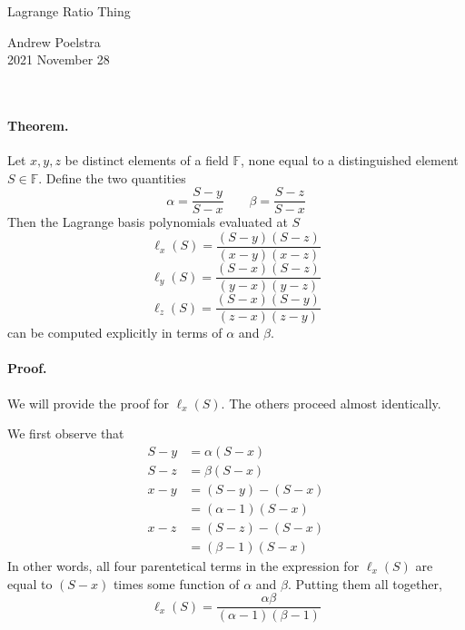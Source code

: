 \documentclass[letterpaper]{article}
\begin{document}
\begin{minipage}[b]{0.7\linewidth}
{\huge Lagrange Ratio Thing}
\end{minipage}
\begin{minipage}[b]{0.3\linewidth}
  \begin{flushright}
    Andrew Poelstra\\
    2021 November 28
  \end{flushright}
\end{minipage}
\\

\paragraph{Theorem.} Let $x,y,z$ be distinct elements of a field $\mathbb{F}$,
none equal to a distinguished element $S\in\mathbb{F}$. Define the two quantities
\[
    \alpha = \frac{S - y}{S - x} \qquad
    \beta = \frac{S - z}{S - x}
\]
Then the Lagrange basis polynomials evaluated at $S$
\[ \ell_x(S) = \frac{(S - y)(S - z)}{(x - y)(x - z)} \]
\[ \ell_y(S) = \frac{(S - x)(S - z)}{(y - x)(y - z)} \]
\[ \ell_z(S) = \frac{(S - x)(S - y)}{(z - x)(z - y)} \]
can be computed explicitly in terms of $\alpha$ and $\beta$.

\paragraph{Proof.} We will provide the proof for $\ell_x(S)$. The others
proceed almost identically.

We first observe that
\begin{align*}
S - y &= \alpha(S - x) \\
S - z &= \beta(S - x) \\
x - y &= (S - y) - (S - x) \\
      &= (\alpha - 1)(S - x) \\
x - z &= (S - z) - (S - x) \\
      &= (\beta - 1)(S - x)
\end{align*}
In other words, all four parentetical terms in the expression for $\ell_x(S)$
are equal to $(S - x)$ times some function of $\alpha$ and $\beta$. Putting
them all together,
\[ \ell_x(S) = \frac{\alpha\beta}{(\alpha - 1)(\beta - 1)} \]
\end{document}
